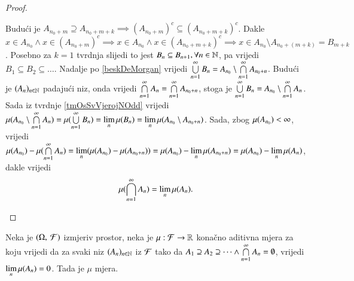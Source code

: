 \begin{proof}
\begin{enumerate}[label={(\roman*)}]
            Budu\' ci je $A_{n_0+m} \supseteq A_{n_0+m+k} \implies (A_{n_0+m})^c
            \subseteq (A_{n_0+m+k})^c$.
            Dakle $x \in A_{n_0} \land x \in (A_{n_0+m})^c \implies x \in A_{n_0}
            \land x \in (A_{n_0+m+k})^c \implies x \in A_{n_0} \setminus A_{n_0+(m+k)}
            = B_{m+k}$.
            Posebno za $k=1$ tvrdnja slijedi to jest $B_n \subseteq B_{n+1},
            \forall n \in \mathbb{N}$, pa vrijedi $B_1 \subseteq B_2 \subseteq \dots$.
            Nadalje po \eqref{beskDeMorgan} vrijedi $\bigcup\limits_{n=1}^{\infty}
            B_n = A_{n_0} \setminus \bigcap\limits_{n=1}^{\infty} A_{n_0+n}$.
            Budu\' ci je $(A_n)_{n \in \mathbb{N}}$ padaju\' ci niz, onda vrijedi
            $\bigcap\limits_{n=1}^{\infty} A_n = \bigcap\limits_{n=1}^{\infty} A_{n_0+n}$, stoga je
            $\bigcup\limits_{n=1}^{\infty} B_n = A_{n_0} \setminus \bigcap\limits_{n=1}^{\infty} A_n$.
            Sada iz tvrdnje \ref{tmOsSvVjerojNOdd} vrijedi $\mu({A_{n_0} \setminus
            \bigcap\limits_{n=1}^{\infty} A_n}) = \mu({\bigcup\limits_{n=1}^{\infty} B_n})
            = \lim\limits_{n} \mu({B_n}) = \lim\limits_{n} \mu({A_{n_0} \setminus
            A_{n_0+n}})$.
            Sada, zbog $\mu({A_{n_0}}) < \infty$, vrijedi $\mu({A_{n_0}})
            - \mu({\bigcap\limits_{n=1}^{\infty} A_n}) = \lim\limits_{n}
            (\mu({A_{n_0}}) - \mu({A_{n_0+n}})) = \mu({A_{n_0}})
            - \lim\limits_{n} \mu({A_{n_0+n}}) = \mu({A_{n_0}}) - \lim\limits_{n}
            \mu({A_n})$, dakle vrijedi
            \begin{equation*}
                \mu({\bigcap\limits_{n=1}^{\infty} A_n}) = \lim\limits_{n} \mu({A_n}).
            \end{equation*}
    \end{enumerate}
\end{proof}

\begin{prop}
    Neka je $(\Omega, \: \mathcal{F})$ izmjeriv prostor, neka je $\mu : \mathcal{F} \to \mathbb{R}$ kona\v cno
    aditivna mjera za koju vrijedi da za svaki niz $(A_n)_{n \in \mathbb{N}}$ iz $\mathcal{F}$ tako da
    $A_1 \supseteq A_2 \supseteq \dots \land \bigcap\limits_{n=1}^{\infty} A_n = \emptyset$,
    vrijedi $\lim\limits_{n} \mu({A_n}) = 0$. Tada je $\mu$ mjera.
\end{prop}

